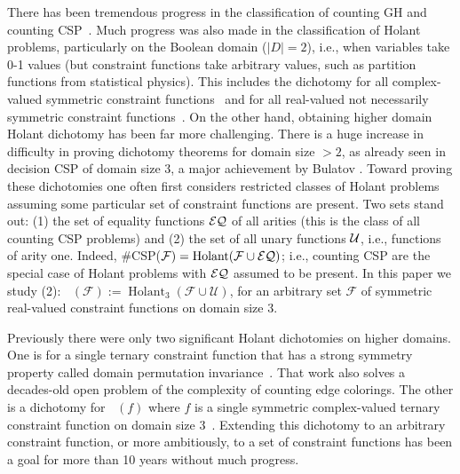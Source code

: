 \documentclass[11pt]{article}
\DeclareMathOperator{\hol}{Holant}
\DeclareMathOperator{\holts}{Holant^*_3}
\begin{document}
There has been tremendous progress in the classification of 
counting GH and counting CSP~\cite{Creignou1996ComplexityOG, doi:10.1137/070690201, 10.1145/1536414.1536511,
10.1145/2528400, DBLP:journals/siamcomp/DyerR13, 5959820, Cai2011ComplexityOC, 
dyer-graph-hom,
bulatov_complexity_2005, goldberg-partition,  hutchison_graph_2010}.
Much progress was also made in the classification of 
Holant problems, particularly on the Boolean domain ($|D|=2$), 
i.e., when variables take 0-1 values (but constraint functions take
arbitrary values, such as partition functions from
statistical physics). This includes the
dichotomy for all complex-valued symmetric constraint functions~\cite{complex-symmetric-holant-dichotomy}
and for all real-valued not necessarily symmetric constraint functions~\cite{real-holant-dichotomy}.
On the other hand, obtaining higher domain Holant dichotomy has been far more challenging.
There is a huge increase in difficulty in proving dichotomy theorems for domain size $> 2$, as already seen in decision CSP of domain size $3$, a major achievement by Bulatov \cite{bulatov-csp-domain-3}.
Toward proving 
these dichotomies one often first considers restricted classes of
Holant problems assuming some particular set of constraint functions
are present. Two 
sets stand out:
(1) the set of equality functions
 ${\cal EQ}$ of all arities (this is the class of all counting CSP problems)
and (2) the set of all unary functions ${\cal U}$, i.e., functions of arity one.
 Indeed, \#CSP($\mathcal{F})
=\hol(\mathcal{F}
\cup {\cal EQ})$; i.e., counting CSP  are the special case of Holant problems
with  ${\cal EQ}$ assumed to be present.
In this paper we study (2):
$\holts(\mathcal{F}) := \hol_3(\mathcal{F} \cup \mathcal{U})$,
for an arbitrary set $\mathcal{F}$ of symmetric real-valued  constraint functions
on domain size 3. 



Previously there were only two significant Holant dichotomies on higher domains.
One is for
a single ternary constraint function that has a strong symmetry property
called domain permutation invariance~\cite{cai_complexity_2016}. That work also 
solves a decades-old open problem of
the complexity of counting edge colorings. The other is a
dichotomy for $\holts(f)$ where $f$ is a single symmetric complex-valued
ternary constraint function on 
domain size 3~\cite{cai_dichotomy_2013}. Extending this
dichotomy to an arbitrary constraint function, or more ambitiously,
to a set of constraint functions has been a goal for more than 
10 years without much progress.
\end{document}

